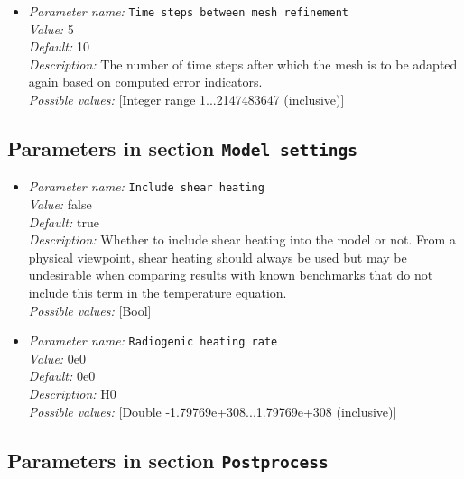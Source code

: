 \begin{itemize}
{\it Description:} The fraction of cells with the largest error that should be flagged for refinement.\\
{\it Possible values:} [Double 0...1 (inclusive)]
\item {\it Parameter name:} {\tt Time steps between mesh refinement}\\
{\it Value:} 5\\
{\it Default:} 10\\
{\it Description:} The number of time steps after which the mesh is to be adapted again based on computed error indicators.\\
{\it Possible values:} [Integer range 1...2147483647 (inclusive)]
\end{itemize}

\subsection{Parameters in section \tt Model settings}

\begin{itemize}
\item {\it Parameter name:} {\tt Include shear heating}\\
{\it Value:} false\\
{\it Default:} true\\
{\it Description:} Whether to include shear heating into the model or not. From a physical viewpoint, shear heating should always be used but may be undesirable when comparing results with known benchmarks that do not include this term in the temperature equation.\\
{\it Possible values:} [Bool]
\item {\it Parameter name:} {\tt Radiogenic heating rate}\\
{\it Value:} 0e0\\
{\it Default:} 0e0\\
{\it Description:} H0\\
{\it Possible values:} [Double -1.79769e+308...1.79769e+308 (inclusive)]
\end{itemize}

\subsection{Parameters in section \tt Postprocess}

